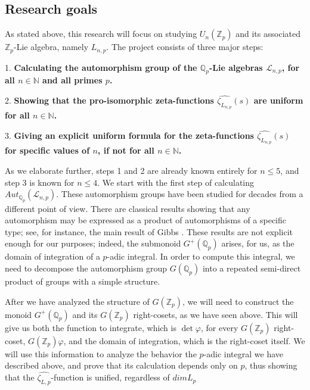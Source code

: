 \documentclass[12pt]{article}
\begin{document}
\subsection{Research goals}
As stated above, this research will focus on studying $U_n(\mathbb{Z}_p)$ and its associated $\mathbb{Z}_p$-Lie algebra, namely $L_{n,p}$. The project consists of three major steps:\par
1. \textbf{Calculating the automorphism group of the $\mathbb{Q}_p$-Lie algebras $\mathcal{L}_{n,p}$, for all $n\in\mathbb{N}$ and all primes $p$.}\par
2. \textbf{Showing that the pro-isomorphic zeta-functions $\hat{\zeta_{L_{n,p}}}(s)$ are uniform for all $n\in\mathbb{N}$.}\par
3. \textbf{Giving an explicit uniform formula for the zeta-functions $\hat{\zeta_{L_{n,p}}}(s)$ for specific values of $n$, if not for all $n\in\mathbb{N}$.}\par
As we elaborate further, steps 1 and 2 are already known entirely for $n\leq 5$, and step 3 is known for $n\leq 4$.
We start with the first step of calculating $Aut_{\mathbb{Q}_p}(\mathcal{L}_{n,p})$. These automorphism groups have been studied     for decades from a different point of view.  There are classical results showing that any automorphism may be expressed as a product of automorphisms of a specific type; see, for instance, the main result of Gibbs \cite{Gibbs}.  These results are not explicit enough for our purposes; indeed, the submonoid $G^+(\mathbb{Q}_p)$ arises, for us, as the domain of integration of a $p$-adic integral.  In order to compute this integral, we need to decompose the automorphism group $G(\mathbb{Q}_p)$ into a repeated semi-direct product of groups with a simple structure.
\par
After we have analyzed the structure of $G(\mathbb{Z}_p)$, we will need to construct the monoid $G^{+}(\mathbb{Q}_p)$ and its $G(\mathbb{Z}_p)$ right-cosets, as we have seen above. This will give us both the function to integrate, which is $\det\varphi$, for every $G(\mathbb{Z}_p)$ right-coset, $G(\mathbb{Z}_p)\varphi$, and the domain of integration, which is the right-coset itself. We will use this information to analyze the behavior the $p$-adic integral we have described above, and prove that its calculation depends only on $p$, thus showing that the $\hat{\zeta_{L,p}}$-function is unified, regardless of $dimL_p$
\end{document}
